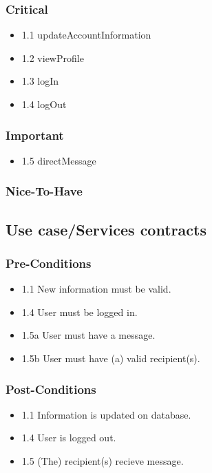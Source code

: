 \documentclass[hidelinks, 12pt, oneside]{article}
\begin{document}
\subsubsection{Critical}
\begin{itemize}
  \item 1.1 updateAccountInformation
  \item 1.2 viewProfile
  \item 1.3 logIn
  \item 1.4 logOut
\end{itemize}

\subsubsection{Important}
\begin{itemize}
  \item 1.5 directMessage
\end{itemize}
\subsubsection{Nice-To-Have}


\subsection{Use case/Services contracts}
\subsubsection{Pre-Conditions}								%
\begin{itemize}
  \item 1.1 New information must be valid.
  \item 1.4 User must be logged in.
  \item 1.5a User must have a message.
  \item 1.5b User must have (a) valid recipient(s).
\end{itemize}

\subsubsection{Post-Conditions}%
\begin{itemize}
  \item 1.1 Information is updated on database.
  \item 1.4 User is logged out.
  \item 1.5 (The) recipient(s) recieve message.
\end{itemize}
\end{document}
